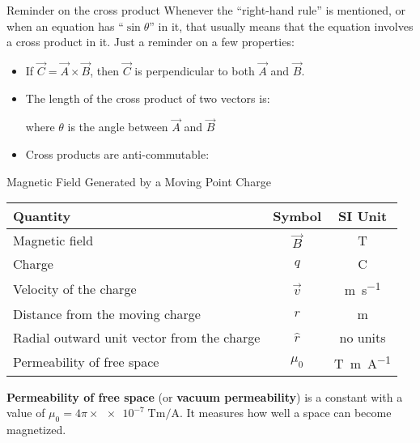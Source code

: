 \documentclass[12pt,aspectratio=169]{beamer}
\begin{document}
\begin{frame}{Reminder on the cross product}
  Whenever the ``right-hand rule'' is mentioned, or when an equation has
  ``$\sin\theta$'' in it, that usually means that the equation involves a
  cross product in it. Just a reminder on a few properties:
  \begin{itemize}
  \item If $\vec C=\vec A\times\vec B$, then $\vec C$ is perpendicular to both
    $\vec A$ and $\vec B$.
  \item The length of the cross product of two vectors is:
    
    where $\theta$ is the angle between $\vec A$ and $\vec B$
  \item Cross products are anti-commutable:

  \end{itemize}
\end{frame}



\begin{frame}{Magnetic Field Generated by a Moving Point Charge}

  \begin{center}
    \begin{tabular}{l|c|c}
      \rowcolor{pink}
      \textbf{Quantity} & \textbf{Symbol} & \textbf{SI Unit} \\ \hline
      Magnetic field                  & $\vec B$ & \si\tesla \\
      Charge                          & $q$      & \si\coulomb \\
      Velocity of the charge          & $\vec v$ & \si{\meter\per\second}\\
      Distance from the moving charge & $r$      & \si\metre\\
      Radial outward unit vector from the charge & $\hat r$ & no units\\
      Permeability of free space & $\mu_0$ & \si{\tesla\metre\per\ampere}
    \end{tabular}
  \end{center}
  \textbf{Permeability of free space} (or \textbf{vacuum permeability}) is a
  constant with a value of
  $\mu_0=4\pi\times\num{e-7}\;\si{\tesla\metre\per\ampere}$. It measures how
  well a space can become magnetized.
\end{frame}
\end{document}

